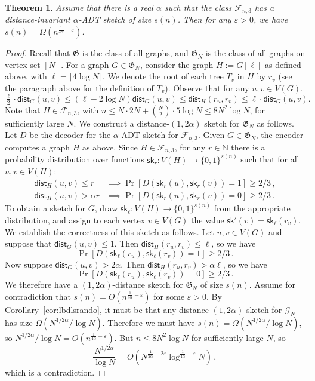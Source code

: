 \documentclass[11pt]{article}
\newtheorem{thm}{Theorem}[section]
\theoremstyle{definition}
\newcommand{\zo}{\{0,1\}}
\newcommand{\G}{\mathcal{G}}
\newcommand{\sk}{\mathsf{sk}}
\newcommand{\eps}{\varepsilon}
\renewcommand{\le}{\leqslant}
\renewcommand{\leq}{\leqslant}
\renewcommand{\geq}{\geqslant}
\def\F {{\mathcal F}}
\def\G {{\mathcal G}}
\def\fG{{\mathfrak G}}
\def\bN{{\mathbb N}}
\def\sk {\mathsf{sk}}
\newcommand{\dist}{\mathsf{dist}}
\begin{document}
\begin{thm}\label{thm:cubic}
Assume that there is a real $\alpha$ such that
the class $\F_{n,3}$ has a distance-invariant $\alpha$-ADT sketch of size $s(n)$. Then for any
$\eps>0$, we have $s(n)=\Omega\left(n^{\frac{1}{4\alpha}-\eps}\right)$.
\end{thm}
\begin{proof}
Recall that $\fG$ is the class of all graphs, and $\fG_N$ is the class of all graphs on vertex set
$[N]$.  For a graph $G \in \fG_N $, consider the graph $H:=G[\ell]$ as defined above, with
$\ell=\lceil  4 \log N\rceil$. We denote the root of each tree $T_v$ in $H$ by $r_v$ (see the
paragraph above for the definition of $T_v$). Observe that for any $u,v\in V(G)$,
\[
\tfrac{\ell}2 \cdot \dist_G(u,v) \le (\ell- 2 \log N)\dist_G(u,v) \le \dist_H(r_u,r_v)\le \ell \cdot \dist_G(u,v).
\]
Note that $H\in \F_{n,3}$, with $n\le N\cdot 2N+ {N\choose 2}\cdot 5 \log N\le 8 N^2 \log N$, for
sufficiently large $N$.  We construct a distance-$(1,2\alpha)$ sketch for $\fG_N$ as follows. Let
$D$ be the decoder for the $\alpha$-ADT sketch for $\F_{n,3}$.  Given $G \in \fG_{N}$, the encoder
computes a graph $H$ as above. Since $H \in \F_{n,3}$, for any $r \in \bN$ there is a probability
distribution over functions $\sk_r : V(H) \to \zo^{s(n)}$ such that for all $u,v \in V(H)$:
\begin{align*}
  \dist_H(u,v) \leq r &\implies \Pr[ D(\sk_r(u),\sk_r(v)) = 1 ] \geq 2/3 \,,\\
  \dist_H(u,v) > \alpha r &\implies \Pr[ D(\sk_r(u),\sk_r(v)) = 0 ] \geq 2/3 \,.
\end{align*}
To obtain a sketch for $G$, draw $\sk_\ell : V(H) \to \zo^{s(n)}$ from the appropriate distribution,
and assign to each vertex $v \in V(G)$ the value $\sk'(v) = \sk_\ell(r_v)$. We establish the correctness
of this sketch as follows.  Let $u,v \in V(G)$ and suppose that $\dist_G(u,v) \leq 1$. Then
$\dist_H(r_u,r_v) \leq \ell$, so we have
\[
  \Pr[ D(\sk_\ell(r_u), \sk_\ell(r_v)) = 1 ] \geq 2/3 \,.
\]
Now suppose $\dist_G(u,v) > 2 \alpha$. Then $\dist_H(r_u,r_v) > \alpha \ell$, so we have
\[
  \Pr[ D(\sk_\ell(r_u), \sk_\ell(r_v)) = 0 ] \geq 2/3 \,.
\]
We therefore have a $(1,2\alpha)$-distance sketch for $\fG_N$ of size $s(n)$. Assume for
contradiction that $s(n) = O\left(n^{\tfrac{1}{4\alpha}-\eps}\right)$ for some $\eps >0 $.
By Corollary~\ref{cor:lbdlsrando}, it must be that any distance-$(1,2\alpha)$ sketch for $\G_N$ has
size $\Omega(N^{1/2\alpha}/\log N)$. Therefore we must have $s(n) = \Omega(N^{1/2\alpha}/\log N)$,
so $N^{1/2\alpha}/\log N = O\left(n^{\tfrac{1}{4\alpha}-\eps}\right)$. But
$n \leq 8 N^2 \log N$ for sufficiently large $N$, so
\[
  \frac{N^{1/2\alpha}}{\log N} = O\left(N^{\tfrac{1}{2\alpha} - 2\eps}
\log^{\tfrac{1}{4\alpha}-\eps} N \right) \,,
\]
which is a contradiction.
\end{proof}
\end{document}
